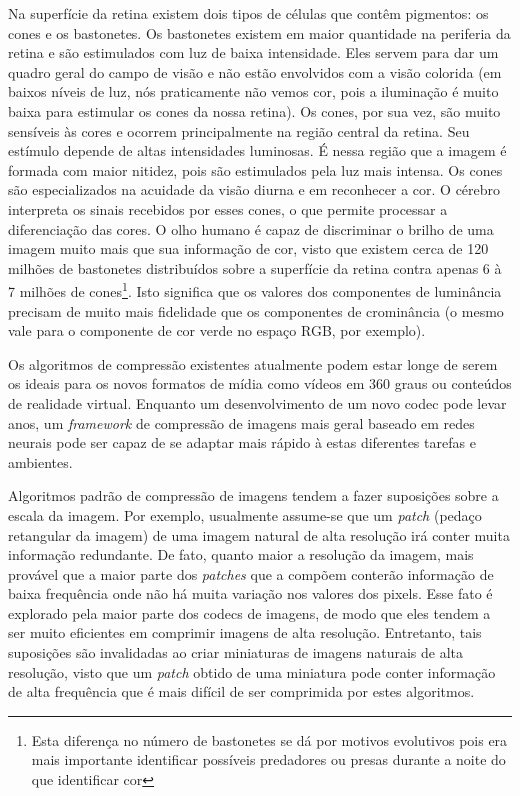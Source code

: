 Na superfície da retina existem dois tipos de células que contêm pigmentos: os cones e os bastonetes. Os bastonetes existem em maior quantidade na periferia da retina e são estimulados com luz de baixa intensidade. Eles servem para dar um quadro geral do campo de visão e não estão envolvidos com a visão colorida (em baixos níveis de luz, nós praticamente não vemos cor, pois a iluminação é muito baixa para estimular os cones da nossa retina). Os cones, por sua vez, são muito sensíveis às cores e ocorrem principalmente na região central da retina. Seu estímulo depende de altas intensidades luminosas. É nessa região que a imagem é formada com maior nitidez, pois são estimulados pela luz mais intensa. Os cones são especializados na acuidade da visão diurna e em reconhecer a cor. O cérebro interpreta os sinais recebidos por esses cones, o que permite processar a diferenciação das cores. O olho humano é capaz de discriminar o brilho de uma imagem muito mais que sua informação de cor, visto que existem cerca de 120 milhões de bastonetes distribuídos sobre a superfície da retina contra apenas 6 à 7 milhões de cones\footnote{Esta diferença no número de bastonetes se dá por motivos evolutivos pois era mais importante identificar possíveis predadores ou presas durante a noite do que identificar cor}. Isto significa que os valores dos componentes de luminância precisam de muito mais fidelidade que os componentes de crominância (o mesmo vale para o componente de cor verde no espaço RGB, por exemplo).

Os algoritmos de compressão existentes atualmente podem estar longe de serem os ideais para os novos formatos de mídia como vídeos em 360 graus ou conteúdos de realidade virtual. Enquanto um desenvolvimento de um novo codec pode levar anos, um \textit{framework} de compressão de imagens mais geral baseado em redes neurais pode ser capaz de se adaptar mais rápido à estas diferentes tarefas e ambientes.

Algoritmos padrão de compressão de imagens tendem a fazer suposições sobre a escala da imagem. Por exemplo, usualmente assume-se que um \textit{patch} (pedaço retangular da imagem) de uma imagem natural de alta resolução irá conter muita informação redundante. De fato, quanto maior a resolução da imagem, mais provável que a maior parte dos \textit{patches} que a compõem conterão informação de baixa frequência onde não há muita variação nos valores dos pixels. Esse fato é explorado pela maior parte dos codecs de imagens, de modo que eles tendem a ser muito eficientes em comprimir imagens de alta resolução. Entretanto, tais suposições são invalidadas ao criar miniaturas de imagens naturais de alta resolução, visto que um \textit{patch} obtido de uma miniatura pode conter informação de alta frequência que é mais difícil de ser comprimida por estes algoritmos.


